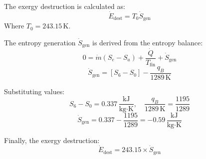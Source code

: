 The exergy destruction is calculated as:  
\[
\dot{E}_{\text{dest}} = T_0 \dot{S}_{\text{gen}}
\]  
Where \( T_0 = 243.15 \, \text{K} \).  

The entropy generation \( \dot{S}_{\text{gen}} \) is derived from the entropy balance:  
\[
0 = \dot{m}(S_e - S_a) + \frac{\dot{Q}}{T_{\text{fin}}} + \dot{S}_{\text{gen}}
\]  
\[
\dot{S}_{\text{gen}} = [S_6 - S_0] - \frac{q_B}{1289 \, \text{K}}
\]  

Substituting values:  
\[
S_6 - S_0 = 0.337 \, \frac{\text{kJ}}{\text{kg·K}}, \quad \frac{q_B}{1289 \, \text{K}} = \frac{1195}{1289}
\]  
\[
\dot{S}_{\text{gen}} = 0.337 - \frac{1195}{1289} = -0.59 \, \frac{\text{kJ}}{\text{kg·K}}
\]  

Finally, the exergy destruction:  
\[
\dot{E}_{\text{dest}} = 243.15 \times \dot{S}_{\text{gen}}
\]